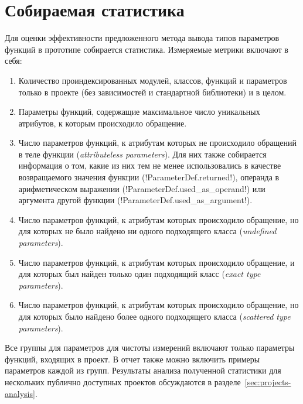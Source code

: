 \section{Собираемая статистика}
\label{sec:statistics-collecting}

Для оценки эффективности предложенного метода вывода типов параметров функций
в прототипе собирается статистика. Измеряемые метрики включают в себя:

\begin{enumerate}
  \item Количество проиндексированных модулей, классов, функций и параметров
    только в проекте (без зависимостей и стандартной библиотеки) и в целом.

  \item Параметры функций, содержащие максимальное число уникальных атрибутов, к
    которым происходило обращение.

  \item Число параметров функций, к атрибутам которых не происходило обращений в теле
    функции (\emph{attributeless parameters}). Для них также собирается
    информация о том, какие из них тем не менее использовались в качестве
    возвращаемого значения функции (!ParameterDef.returned!), операнда в
    арифметическом выражении (!ParameterDef.used_as_operand!) или аргумента
    другой функции (!ParameterDef.used_as_argument!).

  \item Число параметров функций, к атрибутам которых происходило обращение, но для
    которых не было найдено ни одного подходящего класса (\emph{undefined
      parameters}).

  \item Число параметров функций, к атрибутам которых происходило обращение, и для
    которых был найден только один подходящий класс (\emph{exact type parameters}).

  \item Число параметров функций, к атрибутам которых происходило обращение, но для
    которых было найдено более одного подходящего класса (\emph{scattered type
      parameters}).

\end{enumerate}

Все группы для параметров для чистоты измерений включают только параметры функций,
входящих в проект. В отчет также можно включить примеры параметров каждой из групп.
Результаты анализа полученной статистики для нескольких публично доступных
проектов обсуждаются в разделе~\ref{sec:projects-analysis}.

